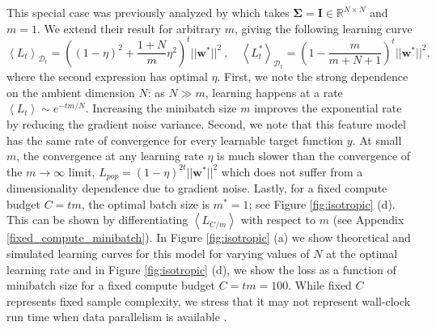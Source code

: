 \documentclass{article} %
\def\w{\bm w}
\def\w{\mathbf w}
\def\bSigma{\mathbf \Sigma}
\def\D{\mathcal D}
\def\I{\mathbf I}
\begin{document}
This special case was previously analyzed by  \citet{Werfel} which takes $\bSigma = \I \in \mathbb{R}^{N \times N}$ and $m = 1$. We extend their result for arbitrary $m$, giving the following learning curve
\begin{equation}\label{eq:unstruct}
    \left< L_t \right>_{\D_t}
    = \left( \left( 1 -  \eta\right)^2 + \frac{1+N}{m}\eta^2  \right)^t ||\w^*||^2  \ , \quad \left< L_t^* \right>_{\mathcal D_t} = \left(1-\frac{m}{m+N+1} \right)^t ||\w^*||^2,
\end{equation}
where the second expression has optimal $\eta$. First, we note the strong dependence on the ambient dimension $N$: as $N \gg m$, learning happens at a rate $ \left< L_t \right> \sim e^{-t m/N}$. Increasing the minibatch size $m$ improves the exponential rate by reducing the gradient noise variance. Second, we note that this feature model has the same rate of convergence for every learnable target function $y$. At small $m$, the convergence at any learning rate $\eta$ is much slower than the convergence of the $m\to\infty$ limit, $L_{pop} = (1-\eta)^{2t} ||\w^*||^2$ which does not suffer from a dimensionality dependence due to gradient noise. Lastly, for a fixed compute budget $C=tm$, the optimal batch size is $m^* = 1$; see Figure \ref{fig:isotropic} (d). This can be shown by differentiating $\left< L_{C/m} \right>$ with respect to $m$ (see Appendix \ref{fixed_compute_minibatch}). 
In Figure \ref{fig:isotropic} (a) we show  theoretical and simulated learning curves for this model for varying values of $N$ at the optimal learning rate and in Figure \ref{fig:isotropic} (d), we show the loss as a function of minibatch size for a fixed compute budget $C = t m = 100$. While fixed $C$ represents fixed sample complexity, we stress that it may not represent wall-clock run time when data parallelism is available  \citep{shallue2018measuring}. 
\end{document}
